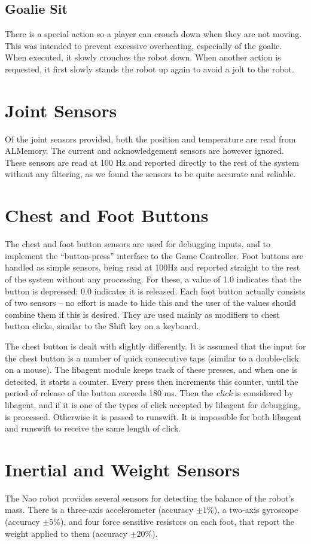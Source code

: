\documentclass[pdftex,11pt,a4paper]{report}
\begin{document}
\subsection{Goalie Sit}
There is a special action so a player can crouch down when they are not
moving. This was intended to prevent excessive overheating, especially of
the goalie. When executed, it slowly crouches the robot down. When another
action is requested, it first slowly stands the robot up again to avoid a
jolt to the robot.
\section{Joint Sensors}
Of the joint sensors provided, both the position and temperature are read
from ALMemory. The current and acknowledgement sensors are however ignored.
These sensors are read at 100 Hz and reported directly to the rest of the
system without any filtering, as we found the sensors to be quite accurate
and reliable.

\section{Chest and Foot Buttons}
The chest and foot button sensors are used for debugging inputs, and to
implement the ``button-press'' interface to the Game Controller. Foot
buttons are handled as simple sensors, being read at 100Hz and reported
straight to the rest of the system without any processing. For these, a
value of 1.0 indicates that the button is depressed; 0.0 indicates it is
released. Each foot button actually consists of two sensors -- no effort is
made to hide this and the user of the values should combine them if this is
desired. They are used mainly as modifiers to chest button clicks, similar
to the Shift key on a keyboard.

The chest button is dealt with slightly differently. It is assumed that the
input for the chest button is a number of quick consecutive taps (similar
to a double-click on a mouse). The libagent module keeps track of these
presses, and when one is detected, it starts a counter. Every press then
increments this counter, until the period of release of the button exceeds
180 ms. Then the \emph{click} is considered by libagent, and if it is one of
the types of click accepted by libagent for debugging, is processed.
Otherwise it is passed to runswift. It is impossible for both libagent and
runswift to receive the same length of click.

\section{Inertial and Weight Sensors}
The Nao robot provides several sensors for detecting the balance of the
robot's mass. There is a three-axis accelerometer (accuracy $\pm 1 \%$), a two-axis gyroscope (accuracy
$\pm 5 \%$), and four force sensitive resistors on each foot, that report
the weight applied to them (accuracy $\pm20\%$).
\end{document}
